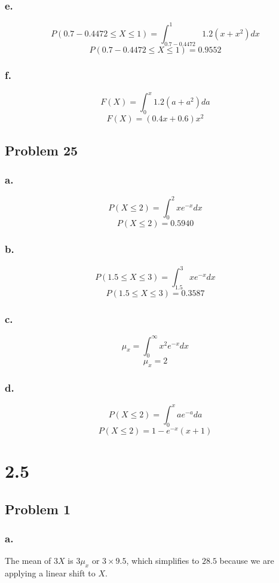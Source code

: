 \documentclass[11pt]{article}
\begin{document}
\subsubsection*{e.}
\[ P(0.7 - 0.4472 \le X\le 1) = \int_{0.7 - 0.4472}^{1} 1.2(x+x^2) dx \]
\[ P(0.7 - 0.4472 \le X\le 1) = 0.9552 \]


\subsubsection*{f.}
\[ F(X) = \int_{0}^{x} 1.2(a+a^2) da \]
\[ F(X) = (0.4x + 0.6) x^2  \]

\subsection*{Problem 25}
\subsubsection*{a.}
\[P(X\le2) = \int_{0}^{2}xe^{-x} dx \]
\[P(X\le2) = 0.5940 \]

\subsubsection*{b.}
\[ P(1.5 \le X \le 3) = \int_{1.5}^{3}xe^{-x} dx \]
\[ P(1.5 \le X \le 3) = 0.3587 \]

\subsubsection*{c.}
\[ \mu_x = \int_{0}^{\infty}x^2e^{-x} dx \]
\[ \mu_x = 2 \]

\subsubsection*{d.}
\[P(X\le2) = \int_{0}^{x}ae^{-a} da \]
\[P(X\le2) = 1 - e^{-x}(x+1) \]

\section*{2.5}
\subsection*{Problem 1}
\subsubsection*{a.}
The mean of $3X$ is $3\mu_x$ or $3\times 9.5$, which simplifies to $28.5$
because we are applying a linear shift to $X$.
\end{document}
